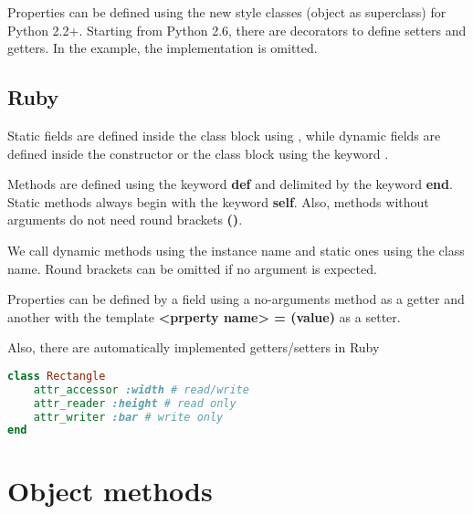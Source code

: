 \documentclass{KodeBook}
\begin{document}
Properties can be defined using the new style classes (object as superclass) for Python 2.2+.
Starting from Python 2.6, there are decorators to define setters and getters.
In the example, the implementation is omitted.



\subsection{Ruby}

Static fields are defined inside the class block using \textbf{\@\@}, while dynamic fields are defined inside the constructor or the class block using the keyword \textbf{\@}. 



Methods are defined using the keyword \textbf{def} and delimited by the keyword \textbf{end}. 
Static methods always begin with the keyword \textbf{self}.
Also, methods without arguments do not need round brackets \textbf{()}.



We call dynamic methods using the instance name and static ones using the class name. 
Round brackets can be omitted if no argument is expected.



Properties can be defined by a field using a no-arguments method as a getter and another with the template \textbf{<prperty name> = (value)} as a setter.



Also, there are automatically implemented getters/setters in Ruby

\begin{lstlisting}[style=codeStyle, language=Ruby]
class Rectangle
	attr_accessor :width # read/write
	attr_reader :height # read only
	attr_writer :bar # write only
end 
\end{lstlisting} 

\section{Object methods}
\end{document}
